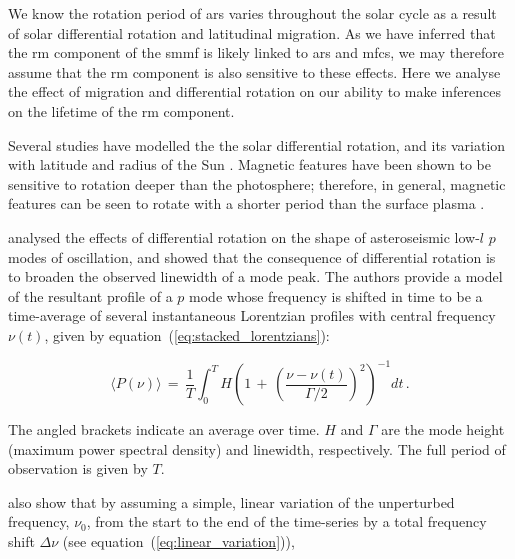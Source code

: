 We know the rotation period of \glspl{ar} varies throughout the solar cycle as a result of solar differential rotation and latitudinal migration. As we have inferred that the \gls{rm} component of the \gls{smmf} is likely linked to \glspl{ar} and \glspl{mfc}, we may therefore assume that the \gls{rm} component is also sensitive to these effects. Here we analyse the effect of migration and differential rotation on our ability to make inferences on the lifetime of the \gls{rm} component.

Several studies have modelled the the solar differential rotation, and its variation with latitude and radius of the Sun \citep[see][for an in depth review of the literature on solar differential rotation]{beck_comparison_2000, howe_solar_2009}. Magnetic features have been shown to be sensitive to rotation deeper than the photosphere; therefore, in general, magnetic features can be seen to rotate with a shorter period than the surface plasma \citep{howe_solar_2009}.

\citet{chaplin_distortion_2008} analysed the effects of differential rotation on the shape of asteroseismic low-$l$ $p$ modes of oscillation, and showed that the consequence of differential rotation is to broaden the observed linewidth of a mode peak. The authors provide a model of the resultant profile of a $p$ mode whose frequency is shifted in time to be a time-average of several instantaneous Lorentzian profiles with central frequency $\nu(t)$, given by equation~(\ref{eq:stacked_lorentzians}):

\begin{equation}
\langle P(\nu) \rangle \, = \, \frac{1}{T} \int^T_0 H \left( 1 \, + \, \left( \frac{\nu - \nu(t)}{\Gamma /2} \right)^2 \right)^{-1} dt \, .
\label{eq:stacked_lorentzians}
\end{equation}

The angled brackets indicate an average over time. $H$ and $\Gamma$ are the mode height (maximum power spectral density) and linewidth, respectively. The full period of observation is given by $T$.

\citet{chaplin_distortion_2008} also show that by assuming a simple, linear variation of the unperturbed frequency, $\nu_0$, from the start to the end of the time-series by a total frequency shift $\Delta\nu$ (see equation~(\ref{eq:linear_variation})),

